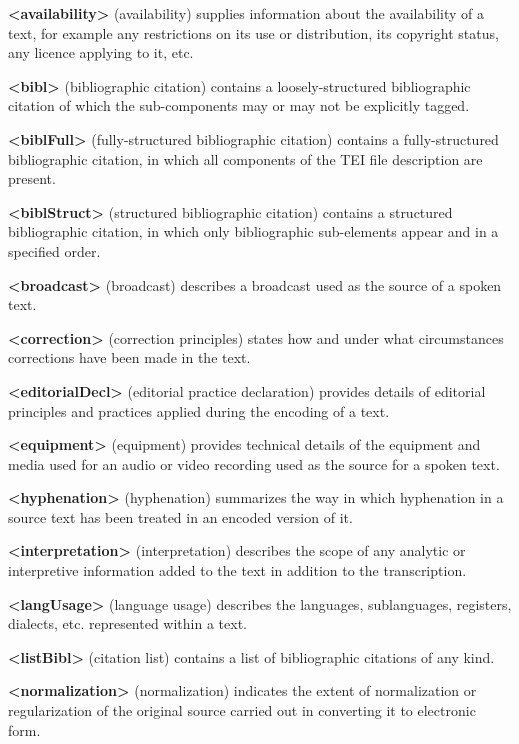 \begin{sansreflist}
  
\item [\textbf{<availability>}] (availability) supplies information about the availability of a text, for example any restrictions on its use or distribution, its copyright status, any licence applying to it, etc.
\item [\textbf{<bibl>}] (bibliographic citation) contains a loosely-structured bibliographic citation of which the sub-components may or may not be explicitly tagged.
\item [\textbf{<biblFull>}] (fully-structured bibliographic citation) contains a fully-structured bibliographic citation, in which all components of the TEI file description are present.
\item [\textbf{<biblStruct>}] (structured bibliographic citation) contains a structured bibliographic citation, in which only bibliographic sub-elements appear and in a specified order.
\item [\textbf{<broadcast>}] (broadcast) describes a broadcast used as the source of a spoken text.
\item [\textbf{<correction>}] (correction principles) states how and under what circumstances corrections have been made in the text.
\item [\textbf{<editorialDecl>}] (editorial practice declaration) provides details of editorial principles and practices applied during the encoding of a text.
\item [\textbf{<equipment>}] (equipment) provides technical details of the equipment and media used for an audio or video recording used as the source for a spoken text.
\item [\textbf{<hyphenation>}] (hyphenation) summarizes the way in which hyphenation in a source text has been treated in an encoded version of it.
\item [\textbf{<interpretation>}] (interpretation) describes the scope of any analytic or interpretive information added to the text in addition to the transcription.
\item [\textbf{<langUsage>}] (language usage) describes the languages, sublanguages, registers, dialects, etc. represented within a text.
\item [\textbf{<listBibl>}] (citation list) contains a list of bibliographic citations of any kind.
\item [\textbf{<normalization>}] (normalization) indicates the extent of normalization or regularization of the original source carried out in converting it to electronic form.

\end{sansreflist}
